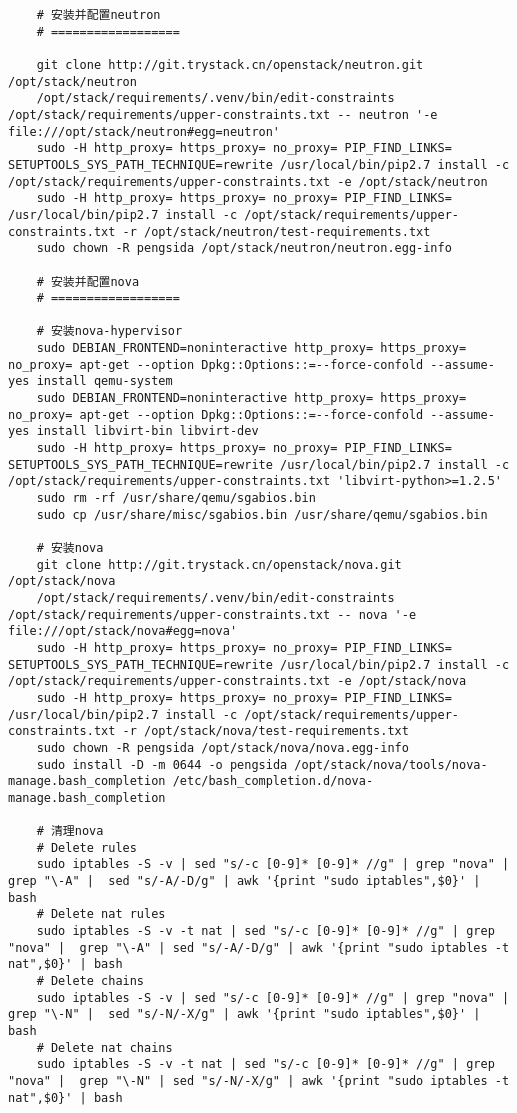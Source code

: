 \documentclass[a4paper,left=1.5cm,right=1.5cm,11pt]{article}
\begin{document}
\begin{lstlisting}
	# 安装并配置neutron
	# ==================

	git clone http://git.trystack.cn/openstack/neutron.git /opt/stack/neutron
	/opt/stack/requirements/.venv/bin/edit-constraints /opt/stack/requirements/upper-constraints.txt -- neutron '-e file:///opt/stack/neutron#egg=neutron'
	sudo -H http_proxy= https_proxy= no_proxy= PIP_FIND_LINKS= SETUPTOOLS_SYS_PATH_TECHNIQUE=rewrite /usr/local/bin/pip2.7 install -c /opt/stack/requirements/upper-constraints.txt -e /opt/stack/neutron
	sudo -H http_proxy= https_proxy= no_proxy= PIP_FIND_LINKS= /usr/local/bin/pip2.7 install -c /opt/stack/requirements/upper-constraints.txt -r /opt/stack/neutron/test-requirements.txt
	sudo chown -R pengsida /opt/stack/neutron/neutron.egg-info

	# 安装并配置nova
	# ==================

	# 安装nova-hypervisor
	sudo DEBIAN_FRONTEND=noninteractive http_proxy= https_proxy= no_proxy= apt-get --option Dpkg::Options::=--force-confold --assume-yes install qemu-system
	sudo DEBIAN_FRONTEND=noninteractive http_proxy= https_proxy= no_proxy= apt-get --option Dpkg::Options::=--force-confold --assume-yes install libvirt-bin libvirt-dev
	sudo -H http_proxy= https_proxy= no_proxy= PIP_FIND_LINKS= SETUPTOOLS_SYS_PATH_TECHNIQUE=rewrite /usr/local/bin/pip2.7 install -c /opt/stack/requirements/upper-constraints.txt 'libvirt-python>=1.2.5'
	sudo rm -rf /usr/share/qemu/sgabios.bin
	sudo cp /usr/share/misc/sgabios.bin /usr/share/qemu/sgabios.bin

	# 安装nova
	git clone http://git.trystack.cn/openstack/nova.git /opt/stack/nova
	/opt/stack/requirements/.venv/bin/edit-constraints /opt/stack/requirements/upper-constraints.txt -- nova '-e file:///opt/stack/nova#egg=nova'
	sudo -H http_proxy= https_proxy= no_proxy= PIP_FIND_LINKS= SETUPTOOLS_SYS_PATH_TECHNIQUE=rewrite /usr/local/bin/pip2.7 install -c /opt/stack/requirements/upper-constraints.txt -e /opt/stack/nova
	sudo -H http_proxy= https_proxy= no_proxy= PIP_FIND_LINKS= /usr/local/bin/pip2.7 install -c /opt/stack/requirements/upper-constraints.txt -r /opt/stack/nova/test-requirements.txt
	sudo chown -R pengsida /opt/stack/nova/nova.egg-info
	sudo install -D -m 0644 -o pengsida /opt/stack/nova/tools/nova-manage.bash_completion /etc/bash_completion.d/nova-manage.bash_completion
	
	# 清理nova
	# Delete rules
    sudo iptables -S -v | sed "s/-c [0-9]* [0-9]* //g" | grep "nova" | grep "\-A" |  sed "s/-A/-D/g" | awk '{print "sudo iptables",$0}' | bash
    # Delete nat rules
    sudo iptables -S -v -t nat | sed "s/-c [0-9]* [0-9]* //g" | grep "nova" |  grep "\-A" | sed "s/-A/-D/g" | awk '{print "sudo iptables -t nat",$0}' | bash
    # Delete chains
    sudo iptables -S -v | sed "s/-c [0-9]* [0-9]* //g" | grep "nova" | grep "\-N" |  sed "s/-N/-X/g" | awk '{print "sudo iptables",$0}' | bash
    # Delete nat chains
    sudo iptables -S -v -t nat | sed "s/-c [0-9]* [0-9]* //g" | grep "nova" |  grep "\-N" | sed "s/-N/-X/g" | awk '{print "sudo iptables -t nat",$0}' | bash
	

\end{lstlisting}
\end{document}
